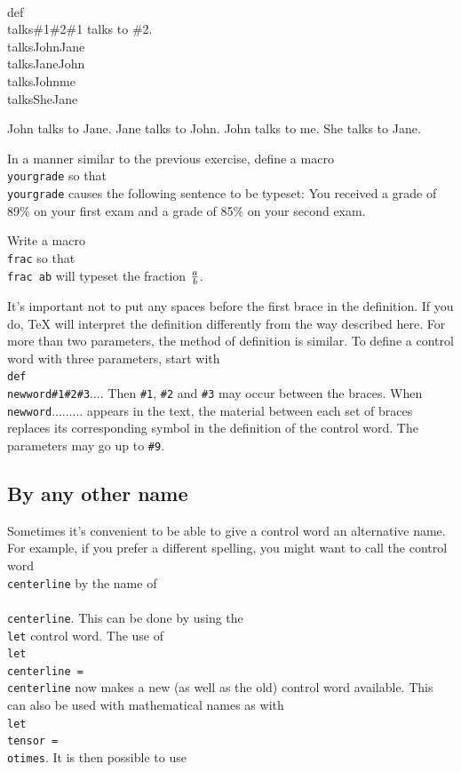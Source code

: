 \beginuser 
\\def\\talks\#1\#2\lb \#1 talks to \#2.\rb 
\\talks\lb John\rb\lb Jane\rb 
\\talks\lb Jane\rb\lb John\rb 
\\talks\lb John\rb\lb me\rb 
\\talks\lb She\rb\lb Jane\rb 
\enduser 

\def\talks#1#2{#1 talks to #2.} 
\talks{John}{Jane} 
\talks{Jane}{John} 
\talks{John}{me} 
\talks{She}{Jane} 

\exercise In a manner similar to the previous exercise, define a 
macro {\tt \\yourgrade} so that {\tt \\yourgrade{}\rb{}\rb} 
causes the following sentence to be typeset: You received a grade 
of 89\% on your first exam and a grade of 85\% on your second 
exam. 

\exercise Write a macro {\tt \\frac} so that {\tt \\frac\lb 
a\rb\lb b\rb} will typeset the fraction ${a\over b}$. 

\bigskip 
It's important not to put any spaces before the first brace in 
the definition. If you do, \TeX{} will interpret the definition 
differently from the way described here. For more than two 
parameters, the method of definition is similar. To define a 
control word with three parameters, start with 
{\tt \\def\\newword\#1\#2\#3\lb$\ldots$\rb}. Then {\tt \#1}, 
{\tt \#2} and {\tt \#3} may occur between the braces. When 
{\tt \\newword\lb$\ldots$\rb\lb$\ldots$\rb\lb$\ldots$\rb} 
appears in the text, the material between each set of braces 
replaces its corresponding symbol in the definition of the 
control word. The parameters may go up to {\tt \#9}. 

\subsection{By any other name} 

Sometimes it's convenient to be able to give a control word an 
alternative name.  For example, if you prefer a different spelling, 
you might want to call the control word {\tt \\centerline} by the 
name of {\tt \\\\centerline}.  This can be done by using the {\tt 
\\let} control word.  The use of {\tt \\let \\centerline = 
\\centerline} now makes a new (as well as the old) control word 
available.  This can also be used with mathematical names as with 
{\tt \\let \\tensor = \\otimes}.  It is then possible to use 

